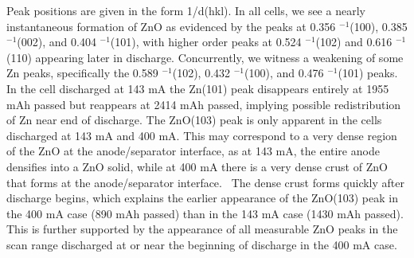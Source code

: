Peak positions are given in the form 1/d(hkl). In all cells, we see a nearly instantaneous formation of ZnO as evidenced by the peaks at 0.356 \angstrom$^{-1}$(100), 0.385 \angstrom$^{-1}$(002), and 0.404 \angstrom$^{-1}$(101), with higher order peaks at 0.524 \angstrom$^{-1}$(102) and 0.616 \angstrom$^{-1}$(110) appearing later in discharge. Concurrently, we witness a weakening of some Zn peaks, specifically the 0.589 \angstrom$^{-1}$(102), 0.432 \angstrom$^{-1}$(100), and 0.476 \angstrom$^{-1}$(101) peaks. In the cell discharged at 143 mA the Zn(101) peak disappears entirely at 1955 mAh passed but reappears at 2414 mAh passed, implying possible redistribution of Zn near end of discharge. The ZnO(103) peak is only apparent in the cells discharged at 143 mA and 400 mA. This may correspond to a very dense region of the ZnO at the anode/separator interface, as at 143 mA, the entire anode densifies into a ZnO solid, while at 400 mA there is a very dense crust of ZnO that forms at the anode/separator interface.~\cite{haibel,horn,Bhadra2015-aq} The dense crust forms quickly after discharge begins, which explains the earlier appearance of the ZnO(103) peak in the 400 mA case (890 mAh passed) than in the 143 mA case (1430 mAh passed). This is further supported by the appearance of all measurable ZnO peaks in the scan range discharged at or near the beginning of discharge in the 400 mA case.

